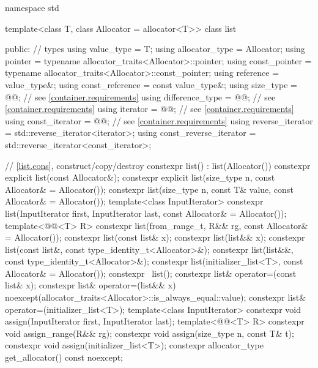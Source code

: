 \begin{codeblock}
namespace std {
  template<class T, class Allocator = allocator<T>>
  class list {
  public:
    // types
    using value_type             = T;
    using allocator_type         = Allocator;
    using pointer                = typename allocator_traits<Allocator>::pointer;
    using const_pointer          = typename allocator_traits<Allocator>::const_pointer;
    using reference              = value_type&;
    using const_reference        = const value_type&;
    using size_type              = @@; // see \ref{container.requirements}
    using difference_type        = @@; // see \ref{container.requirements}
    using iterator               = @@; // see \ref{container.requirements}
    using const_iterator         = @@; // see \ref{container.requirements}
    using reverse_iterator       = std::reverse_iterator<iterator>;
    using const_reverse_iterator = std::reverse_iterator<const_iterator>;

    // \ref{list.cons}, construct/copy/destroy
    constexpr list() : list(Allocator()) { }
    constexpr explicit list(const Allocator&);
    constexpr explicit list(size_type n, const Allocator& = Allocator());
    constexpr list(size_type n, const T& value, const Allocator& = Allocator());
    template<class InputIterator>
      constexpr list(InputIterator first, InputIterator last, const Allocator& = Allocator());
    template<@@<T> R>
      constexpr list(from_range_t, R&& rg, const Allocator& = Allocator());
    constexpr list(const list& x);
    constexpr list(list&& x);
    constexpr list(const list&, const type_identity_t<Allocator>&);
    constexpr list(list&&, const type_identity_t<Allocator>&);
    constexpr list(initializer_list<T>, const Allocator& = Allocator());
    constexpr ~list();
    constexpr list& operator=(const list& x);
    constexpr list& operator=(list&& x)
      noexcept(allocator_traits<Allocator>::is_always_equal::value);
    constexpr list& operator=(initializer_list<T>);
    template<class InputIterator>
      constexpr void assign(InputIterator first, InputIterator last);
    template<@@<T> R>
      constexpr void assign_range(R&& rg);
    constexpr void assign(size_type n, const T& t);
    constexpr void assign(initializer_list<T>);
    constexpr allocator_type get_allocator() const noexcept;

}}
\end{codeblock}
